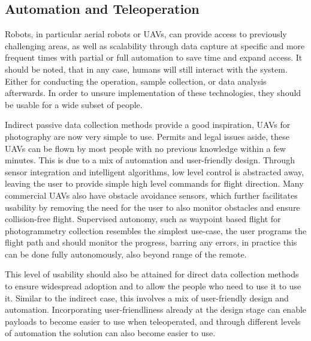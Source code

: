 \subsection{Automation and Teleoperation} %
Robots, in particular aerial robots or UAVs, can provide access to previously challenging areas, as well as scalability through data capture at specific and more frequent times with partial or full automation to save time and expand access. It should be noted, that in any case, humans will still interact with the system. Either for conducting the operation, sample collection, or data analysis afterwards. In order to unsure implementation of these technologies, they should be usable for a wide subset of people.

Indirect passive data collection methods provide a good inspiration, UAVs for photography are now very simple to use. Permits and legal issues aside, these UAVs can be  flown by most people with no previous knowledge within a few minutes. This is due to a mix of automation and user-friendly design. Through sensor integration and intelligent algorithms, low level control is abstracted away, leaving the user to provide simple high level commands for flight direction. Many commercial UAVs also have obstacle avoidance sensors, which further facilitates usability by removing the need for the user to also monitor obstacles and ensure collision-free flight. Supervised autonomy, such as waypoint based flight for photogrammetry collection resembles the simplest use-case, the user programs the flight path and should monitor the progress, barring any errors, in practice this can be done fully autonomously, also beyond range of the remote.

This level of usability should also be attained for direct data collection methods to ensure widespread adoption and to allow the people who need to use it to use it. Similar to the indirect case, this involves a mix of user-friendly design and automation. Incorporating user-friendliness already at the design stage can enable payloads to become easier to use when teleoperated, and through different levels of automation the solution can also become easier to use. 

